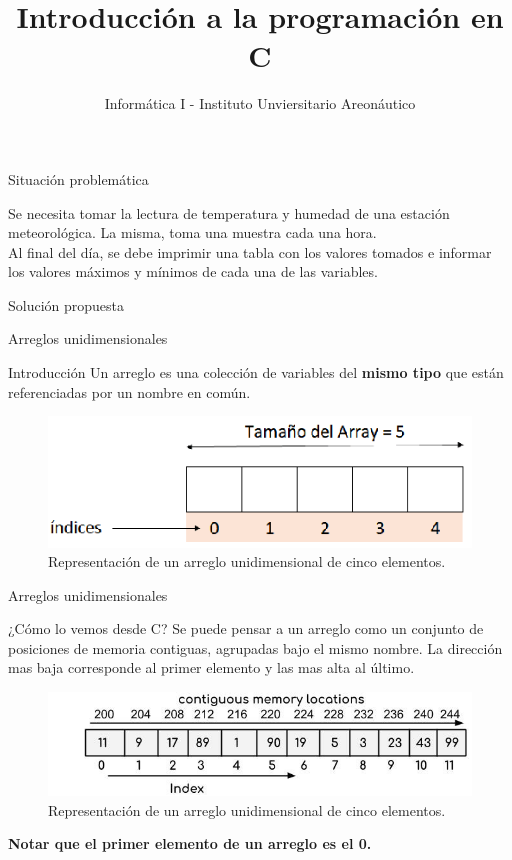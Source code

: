 \documentclass[xcolor=pdftex,table,11pt]{beamer}
\author{Informática I - Instituto Unviersitario Areonáutico}
\title{Introducción a la programación en C}
\begin{document}
\begin{frame}{Situación problemática}

\begin{block}{}
Se necesita tomar la lectura de temperatura y humedad de una estación meteorológica. La misma, toma una muestra cada una hora. \\
Al final del día, se debe imprimir una tabla con los valores tomados e informar los valores máximos y mínimos de cada una de las variables.
\end{block}
\end{frame}

\begin{frame}{Solución propuesta}


\codesetstylefrombeamer
{}

\end{frame}

\begin{frame}{Arreglos unidimensionales}
\begin{block}{Introducción}
Un arreglo es una colección de variables del \textbf{mismo tipo} que están referenciadas por un nombre en común. 
\end{block}

\begin{figure}
 \centering
\includegraphics[scale=0.5]{../img/exported/arrays.png}
\caption{Representación de un arreglo unidimensional de cinco elementos.}
\end{figure}
\end{frame}


\begin{frame}{Arreglos unidimensionales}
\begin{block}{¿Cómo lo vemos desde C?}
Se puede pensar a un arreglo como un conjunto de posiciones de memoria contiguas, agrupadas bajo el mismo nombre. La dirección mas baja corresponde al primer elemento y las mas alta al último.
\end{block}

\begin{figure}
 \centering
\includegraphics[scale=0.5]{../img/exported/array_with_memory.jpg}
\caption{Representación de un arreglo unidimensional de cinco elementos.}
\end{figure}

\textbf{Notar que el primer elemento de un arreglo es el 0.}

\end{frame}
\end{document}
